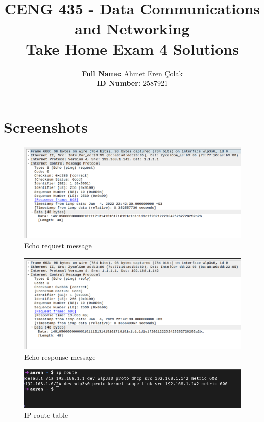 \documentclass[11pt]{article}
\author{
  \textbf{Full Name:} Ahmet Eren Çolak\\
  \textbf{ID Number:} 2587921
}
\title{\textbf{CENG 435 - Data Communications and Networking\\
Take Home Exam 4 Solutions}}
\begin{document}
	\maketitle

	\section*{Screenshots}

	\begin{figure}[h]
		\centering
		\includegraphics[scale=0.4]{request}
		\caption{Echo request message}
	\end{figure}
	
	\begin{figure}[h]
		\centering
		\includegraphics[scale=0.4]{response}
		\caption{Echo response message}
	\end{figure}
	
	\begin{figure}[h]
		\centering
		\includegraphics[scale=0.5]{iproute}
		\caption{IP route table}
	\end{figure}
	
	
	
\end{document}
